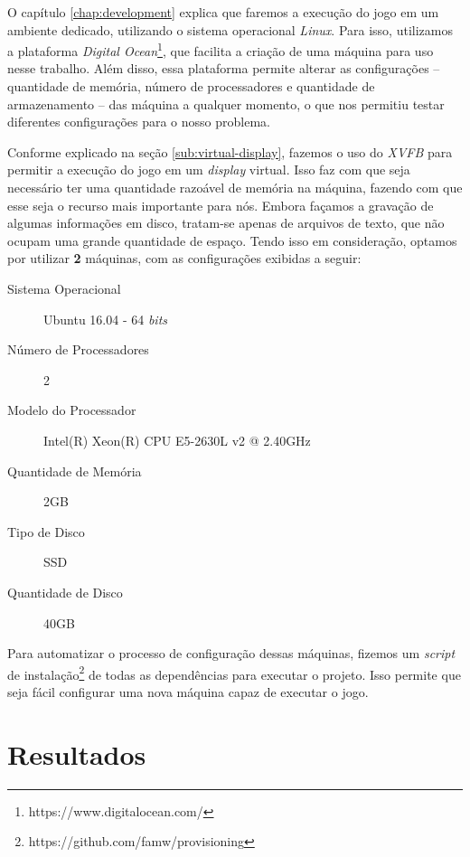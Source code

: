 O capítulo \ref{chap:development} explica que faremos a execução do jogo em um
ambiente dedicado, utilizando o sistema operacional \textit{Linux}. Para isso,
utilizamos a plataforma \textit{Digital
Ocean}\footnote{https://www.digitalocean.com/}, que facilita a criação de uma
máquina para uso nesse trabalho. Além disso, essa plataforma permite alterar as
configurações -- quantidade de memória, número de processadores e quantidade de
armazenamento -- das máquina a qualquer momento, o que nos permitiu testar
diferentes configurações para o nosso problema.

Conforme explicado na seção \ref{sub:virtual-display}, fazemos o uso do
\textit{XVFB} para permitir a execução do jogo em um \textit{display} virtual.
Isso faz com que seja necessário ter uma quantidade razoável de memória na
máquina, fazendo com que esse seja o recurso mais importante para nós. Embora
façamos a gravação de algumas informações em disco, tratam-se apenas de
arquivos de texto, que não ocupam uma grande quantidade de espaço. Tendo isso
em consideração, optamos por utilizar \textbf{2} máquinas, com as configurações
exibidas a seguir:

\begin{description}
    \item [Sistema Operacional] Ubuntu 16.04 - 64 \textit{bits}
    \item [Número de Processadores] 2
    \item [Modelo do Processador] Intel(R) Xeon(R) CPU E5-2630L v2 @ 2.40GHz
    \item [Quantidade de Memória] 2GB
    \item [Tipo de Disco] SSD
    \item [Quantidade de Disco] 40GB
\end{description}

Para automatizar o processo de configuração dessas máquinas, fizemos um
\textit{script} de instalação\footnote{https://github.com/famw/provisioning} de
todas as dependências para executar o projeto. Isso permite que seja fácil
configurar uma nova máquina capaz de executar o jogo.

\section{\label{section:results}Resultados}

